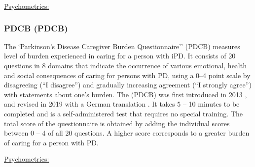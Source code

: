 \underline{Psychometrics:}

\subsubsection{\acl{PDCB} (\acs{PDCB})}
\label{questionnaires:PDCB}
The `Parkinson's Disease Caregiver Burden Questionnaire''  (\acs{PDCB}) measures level of burden experienced in caring for a person with \ac{iPD}. It consists of 20 questions in 8 domains that indicate the occurrence of various emotional, health and social consequences of caring for persons with \ac{PD}, using a 0--4 point scale by disagreeing (``I disagree'') and gradually increasing agreement (``I strongly agree'') with statements about one's burden. The (\acs{PDCB}) was first introduced in 2013 \cite{zhong2013pdcb}, and revised in 2019 with a German translation \cite{klietz2019pdcb}. It takes 5 -- 10 minutes to be completed and is a self-administered test that requires no special training. The total score of the questionnaire is obtained by adding the individual scores between 0 -- 4 of all 20 questions. A higher score corresponds to a greater burden of caring for a person with \ac{PD}.

\underline{Psychometrics:}

